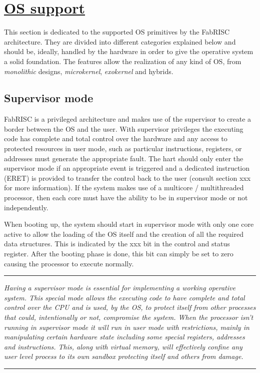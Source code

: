 \section[OS support]{\LARGE\underline{OS support}}

    \vspace{10pt}

    This section is dedicated to the supported OS primitives by the FabRISC architecture. They are divided into different categories explained below and should be, ideally, handled by the hardware in order to give the operative system a solid foundation. The features allow the realization of any kind of OS, from \textit{monolithic} designs, \textit{microkernel}, \textit{exokernel} and hybrids.

    \subsection{Supervisor mode}

        \vspace{10pt}

        FabRISC is a privileged architecture and makes use of the supervisor to create a border between the OS and the user. With supervisor privileges the executing code has complete and total control over the hardware and any access to protected resources in user mode, such as particular instructions, registers, or addresses must generate the appropriate fault. The hart should only enter the supervisor mode if an appropriate event is triggered and a dedicated instruction (ERET) is provided to transfer the control back to the user (consult section xxx for more information). If the system makes use of a multicore / multithreaded processor, then each core must have the ability to be in supervisor mode or not independently.

        \vspace{10pt}

        When booting up, the system should start in supervisor mode with only one core active to allow the loading of the OS itself and the creation of all the required data structures. This is indicated by the xxx bit in the control and status register. After the booting phase is done, this bit can simply be set to zero causing the processor to execute normally.

    \par\noindent\rule{\textwidth}{0.4pt}
    \textit{Having a supervisor mode is essential for implementing a working operative system. This special mode allows the executing code to have complete and total control over the CPU and is used, by the OS, to protect itself from other processes that could, intentionally or not, compromise the system. When the processor isn't running in supervisor mode it will run in user mode with restrictions, mainly in manipulating certain hardware state including some special registers, addresses and instructions. This, along with virtual memory, will effectively confine any user level process to its own sandbox protecting itself and others from damage.}
    \par\noindent\rule{\textwidth}{0.4pt}

